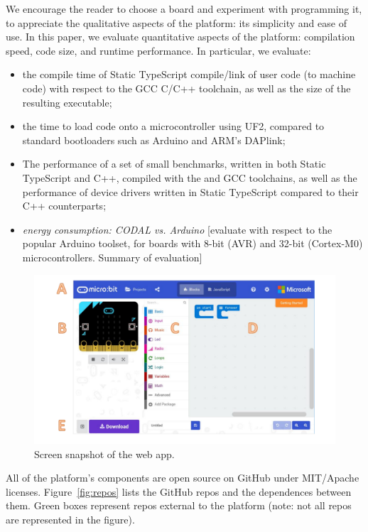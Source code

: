 We encourage the reader to choose a board and experiment with programming it, to appreciate the 
qualitative aspects of the platform: its simplicity and ease of use.  In this 
paper, we evaluate quantitative aspects of the platform: 
compilation speed, code size, and runtime performance.  In particular, we evaluate:
\begin{itemize}
\item the compile time of Static TypeScript compile/link of user code (to machine code) with respect 
      to the GCC C/C++ toolchain, as well as the size of the resulting executable;
\item the time to load code onto a microcontroller using UF2, compared to standard bootloaders
      such as Arduino and ARM's DAPlink; 
\item The performance of a set of small benchmarks, written in both Static TypeScript and C++,
      compiled with the \MC and GCC toolchains, as well as the performance of device drivers
      written in Static TypeScript compared to their C++ counterparts;
\item \emph{energy consumption: CODAL vs. Arduino}
[evaluate with respect to the popular Arduino toolset, for boards with 8-bit (AVR) and 32-bit (Cortex-M0) microcontrollers. 
Summary of evaluation]
\end{itemize}

\begin{figure}[t]
      \includegraphics[width=5in]{screenSnapFig.pdf}
  \caption{\label{fig:screenSnap}Screen snapshot of the \MC web app.}
\end{figure}

All of the platform's components are open source on GitHub
under MIT/Apache licenses. 
Figure~\ref{fig:repos} lists the GitHub repos and the dependences between them. Green boxes represent repos external to the platform (note: not all
repos are represented in the figure).

